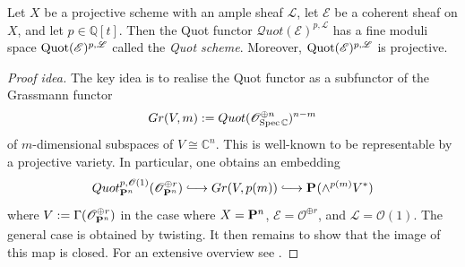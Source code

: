 \documentclass[12pt]{ociamthesis}  %
\begin{document}
\begin{theorem}
  Let $X$ be a projective scheme with an ample sheaf $\mathscr L$,
  let $\mathscr E$ be a coherent sheaf on $X$, and let
  $p\in\mathbb{Q}[t]$. Then the Quot functor
  $\mathcal Quot(\mathscr E)^{p,\mathscr L}$ has a fine moduli space
  $\operatorname{Quot}(\mathscr E)^{p,\mathscr L}$ called the \emph{Quot scheme}.
  Moreover, $\operatorname{Quot}(\mathscr E)^{p,\mathscr L}$ is projective.
  \begin{proof}[Proof idea]
    The key idea is to realise the Quot functor as a subfunctor
    of the Grassmann functor
    \begin{align*}
      Gr(V,m) := Quot(\mathscr O^{\oplus n}_{\operatorname{Spec}\mathbb C})^{n-m}
    \end{align*}
    of $m$-dimensional subspaces of $V\cong\mathbb C^n$. This is
    well-known to be representable by a projective variety.
    \cite[Proposition 8.14]{gortz2010}
    In particular, one obtains an embedding
    \begin{align}\label{eq:quot_embedding}
      Quot^{p,\mathscr O(1)}_{\projective{n}{}}(\mathscr O^{\oplus r}_{\projective{n}{}})
      \longinc Gr(V,p(m))
      \longinc \projective{}{}(\wedge^{p(m)}V^*)
    \end{align}
    where $V := \Gamma(\mathscr O^{\oplus r}_{\mathbf{P}^{n}_{}})$
    in the case where $X=\mathbf{P}^{n}_{}$, $\mathscr E=\mathscr O^{\oplus r}$,
    and $\mathscr L=\mathscr O(1)$. The general case is obtained by
    twisting.
    It then remains to show that the image of this map is closed.
    For an extensive overview see \cite[70-73]{hoskins2016}.
  \end{proof}
\end{theorem}
\end{document}
